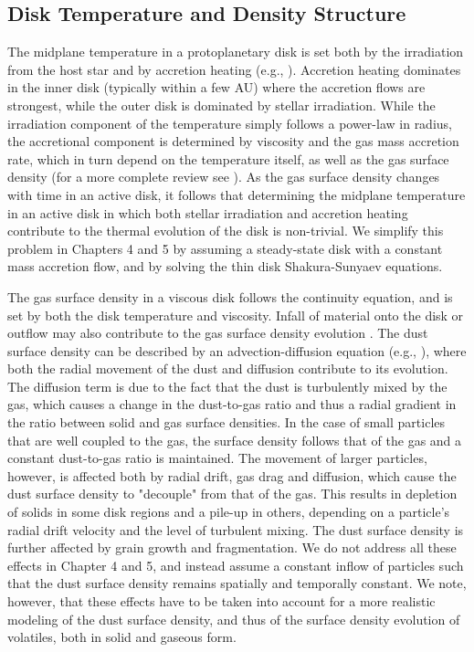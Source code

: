 \subsection{Disk Temperature and Density Structure}

The midplane temperature in a protoplanetary disk is set both by the irradiation from the host star and by accretion heating (e.g., \citealt{armitage10}). Accretion heating dominates in the inner disk (typically within a few AU) where the accretion flows are strongest, while the outer disk is dominated by stellar irradiation. While the irradiation component of the temperature simply follows a power-law in radius, the accretional component is determined by viscosity and the gas mass accretion rate, which in turn depend on the temperature itself, as well as the gas surface density (for a more complete review see \citealt{shakura73}). As the gas surface density changes with time in an active disk, it follows that determining the midplane temperature in an active disk in which both stellar irradiation and accretion heating contribute to the thermal evolution of the disk is non-trivial. We simplify this problem in Chapters 4 and 5 by assuming a steady-state disk with a constant mass accretion flow, and by solving the thin disk Shakura-Sunyaev equations.

The gas surface density in a viscous disk follows the continuity equation, and is set by both the disk temperature and viscosity. Infall of material onto the disk or outflow may also contribute to the gas surface density evolution \citep{birnstiel10}. The dust surface density can be described by an advection-diffusion equation (e.g., \citealt{birnstiel12}), where both the radial movement of the dust and diffusion contribute to its evolution. The diffusion term is due to the fact that the dust is turbulently mixed by the gas, which causes a change in the dust-to-gas ratio and thus a radial gradient in the ratio between solid and gas surface densities. In the case of small particles that are well coupled to the gas, the surface density follows that of the gas and a constant dust-to-gas ratio is maintained. The movement of larger particles, however, is affected both by radial drift, gas drag and diffusion, which cause the dust surface density to "decouple" from that of the gas. This results in depletion of solids in some disk regions and a pile-up in others, depending on a particle's radial drift velocity and the level of turbulent mixing. The dust surface density is further affected by grain growth and fragmentation. We do not address all these effects in Chapter 4 and 5, and instead assume a constant inflow of particles such that the dust surface density remains spatially and temporally constant. We note, however, that these effects have to be taken into account for a more realistic modeling of the dust surface density, and thus of the surface density evolution of volatiles, both in solid and gaseous form.  





